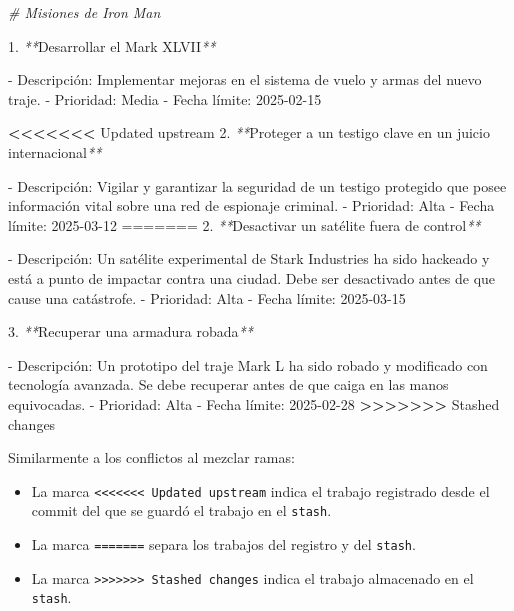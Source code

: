 \documentclass[
]{book}
\newenvironment{Shaded}{\begin{snugshade}}{\end{snugshade}}
\newcommand{\CommentTok}[1]{\textcolor[rgb]{0.56,0.35,0.01}{\textit{#1}}}
\newcommand{\ExtensionTok}[1]{#1}
\newcommand{\NormalTok}[1]{#1}
\newcommand{\OperatorTok}[1]{\textcolor[rgb]{0.81,0.36,0.00}{\textbf{#1}}}
\newcommand{\PreprocessorTok}[1]{\textcolor[rgb]{0.56,0.35,0.01}{\textit{#1}}}
\begin{document}
\begin{Shaded}
\begin{Highlighting}[]
\CommentTok{\# Misiones de Iron Man}

\ExtensionTok{1.} \PreprocessorTok{**}\NormalTok{Desarrollar el Mark XLVII}\PreprocessorTok{**}
   
   \ExtensionTok{{-}}\NormalTok{ Descripción: Implementar mejoras en el sistema de vuelo y armas del nuevo traje.}
   \ExtensionTok{{-}}\NormalTok{ Prioridad: Media}
   \ExtensionTok{{-}}\NormalTok{ Fecha límite: 2025{-}02{-}15}

\OperatorTok{\textless{}\textless{}\textless{}\textless{}\textless{}\textless{}\textless{}}\NormalTok{ Updated }\ExtensionTok{upstream}
\ExtensionTok{2.} \PreprocessorTok{**}\NormalTok{Proteger a un testigo clave en un juicio internacional}\PreprocessorTok{**}

   \ExtensionTok{{-}}\NormalTok{ Descripción: Vigilar y garantizar la seguridad de un testigo protegido que posee información vital sobre una red de espionaje criminal.}
   \ExtensionTok{{-}}\NormalTok{ Prioridad: Alta}
   \ExtensionTok{{-}}\NormalTok{ Fecha límite: 2025{-}03{-}12}
\ExtensionTok{=======}
\ExtensionTok{2.} \PreprocessorTok{**}\NormalTok{Desactivar un satélite fuera de control}\PreprocessorTok{**}
   
   \ExtensionTok{{-}}\NormalTok{ Descripción: Un satélite experimental de Stark Industries ha sido hackeado y está a punto de impactar contra una ciudad. Debe ser desactivado antes de que cause una catástrofe.}
   \ExtensionTok{{-}}\NormalTok{ Prioridad: Alta}
   \ExtensionTok{{-}}\NormalTok{ Fecha límite: 2025{-}03{-}15}

\ExtensionTok{3.} \PreprocessorTok{**}\NormalTok{Recuperar una armadura robada}\PreprocessorTok{**}
   
   \ExtensionTok{{-}}\NormalTok{ Descripción: Un prototipo del traje Mark L ha sido robado y modificado con tecnología avanzada. Se debe recuperar antes de que caiga en las manos equivocadas.}
   \ExtensionTok{{-}}\NormalTok{ Prioridad: Alta}
   \ExtensionTok{{-}}\NormalTok{ Fecha límite: 2025{-}02{-}28}
\OperatorTok{\textgreater{}\textgreater{}\textgreater{}\textgreater{}\textgreater{}\textgreater{}\textgreater{}}\NormalTok{ Stashed }\ExtensionTok{changes}
\end{Highlighting}
\end{Shaded}

Similarmente a los conflictos al mezclar ramas:

\begin{itemize}
\item
  La marca \texttt{\textless{}\textless{}\textless{}\textless{}\textless{}\textless{}\textless{}\ Updated\ upstream} indica el trabajo registrado desde el commit del que se guardó el trabajo en el \texttt{stash}.
\item
  La marca \texttt{=======} separa los trabajos del registro y del \texttt{stash}.
\item
  La marca \texttt{\textgreater{}\textgreater{}\textgreater{}\textgreater{}\textgreater{}\textgreater{}\textgreater{}\ Stashed\ changes} indica el trabajo almacenado en el \texttt{stash}.
\end{itemize}
\end{document}

